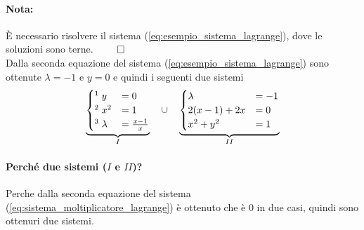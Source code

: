 \begin{example}
	\paragraph{Nota:} È necessario risolvere il sistema (\ref{eq:esempio_sistema_lagrange}), dove le soluzioni sono terne. $\qed$\\
	Dalla seconda equazione del sistema (\ref{eq:esempio_sistema_lagrange}) sono ottenute $\lambda = -1$ e $y=0$ e quindi i seguenti due sistemi
	\begin{equation*}
		\underbrace{\begin{cases}
			\footnotemark\; y &= 0 \\
			\footnotemark\; x^2 &= 1\\
			\footnotemark\; \lambda &= \frac{x-1}{x}
		\end{cases}}_{I} \quad\cup\quad
		\underbrace{\begin{cases}
			\lambda &= -1\\
			2(x-1) + 2x &= 0\\
			x^2 + y^2 &= 1
		\end{cases}}_{II}
	\end{equation*} 
\end{example}
\addtocounter{footnote}{-2}



\paragraph{Perché due sistemi ($I$ e $II$)?} Perche dalla seconda equazione del sistema (\ref{eq:sistema_moltiplicatore_lagrange}) è ottenuto che è 0 in due casi, quindi sono ottenuri due sistemi.

